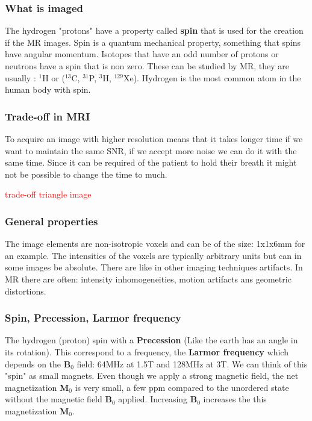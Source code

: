 		\subsubsection*{What is imaged}
		The hydrogen "protons" have a property called \textbf{spin} that is used for the creation if the MR images. Spin is a quantum mechanical property, something that spins have angular momentum. Isotopes that have an odd number of protons or neutrons have a spin that is non zero. These can be studied by MR, they are usually : $^{1}$H or ($^{13}$C, $^{31}$P, $^{3}$H, $^{129}$Xe). Hydrogen is the most common atom in the human body with spin. 

		\subsubsection*{Trade-off in MRI}
		To acquire an image with higher resolution means that it takes longer time if we want to maintain the same SNR, if we accept more noise we can do it with the same time. Since it can be required of the patient to hold their breath it might not be possible to change the time to much. 

		\textcolor{red}{trade-off triangle image}

		\subsubsection*{General properties}
		The image elements are non-isotropic voxels and can be of the size: 1x1x6mm for an example. The intensities of the voxels are typically arbitrary units but can in some images be absolute. There are like in other imaging techniques artifacts. In MR there are often: intensity inhomogeneities, motion artifacts ans geometric distortions.

		
		\subsubsection*{Spin, Precession, Larmor frequency}
		The hydrogen (proton) spin with a \textbf{Precession} (Like the earth has an angle in its rotation). This correspond to a frequency, the \textbf{Larmor frequency} which depends on the \textbf{B}$_0$ field: 64MHz at 1.5T and 128MHz at 3T. We can think of this "spin" as small magnets. Even though we apply a strong magnetic field, the net magnetization \textbf{M}$_0$ is very small, a few ppm compared to the unordered state without the magnetic field \textbf{B}$_0$ applied. Increasing \textbf{B}$_0$ increases the this magnetization \textbf{M}$_0$.

